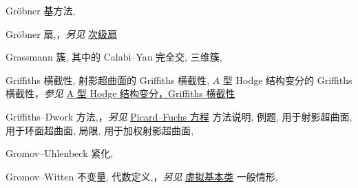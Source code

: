 \begin{theindex}
\indexspace
\item \leavevmode\hypertarget{idx:0452}{Gr\"obner 基方法},\enspace{}
\indexspace
\item \leavevmode\hypertarget{idx:0453}{Gr\"obner 扇},\enspace{}，\textit{另见} \hyperlink{idx:1239}{次级扇}
\indexspace
\item \leavevmode\hypertarget{idx:0454}{Grassmann 簇},\enspace{}
\subitem \leavevmode\hypertarget{idx:0455}{其中的 Calabi--Yau 完全交},\enspace{}
\subsubitem \leavevmode\hypertarget{idx:0456}{三维簇},\enspace{}
\indexspace
\item \leavevmode\hypertarget{idx:0483}{Griffiths 横截性},\enspace{}
\subitem \leavevmode\hypertarget{idx:0484}{射影超曲面的 Griffiths 横截性},\enspace{}
\subitem \leavevmode\hypertarget{idx:0485}{$A$ 型 Hodge 结构变分的 Griffiths 横截性}，\textit{参见} \hyperlink{idx:0021}{A 型 Hodge 结构变分，Griffiths 横截性}
\indexspace
\item \leavevmode\hypertarget{idx:0486}{Griffiths--Dwork 方法},\enspace{}，\textit{另见} \hyperlink{idx:1049}{Picard--Fuchs 方程}
\subitem \leavevmode\hypertarget{idx:0487}{方法说明},\enspace{}
\subitem \leavevmode\hypertarget{idx:0488}{例题},\enspace{}
\subitem \leavevmode\hypertarget{idx:0489}{用于射影超曲面},\enspace{}
\subitem \leavevmode\hypertarget{idx:0490}{用于环面超曲面},\enspace{}
\subitem \leavevmode\hypertarget{idx:0491}{局限},\enspace{}
\subitem \leavevmode\hypertarget{idx:0492}{用于加权射影超曲面},\enspace{}
\indexspace
\item \leavevmode\hypertarget{idx:0493}{Gromov--Uhlenbeck 紧化},\enspace{}
\indexspace
\item \leavevmode\hypertarget{idx:0515}{Gromov--Witten 不变量},\enspace{}
\subitem \leavevmode\hypertarget{idx:0516}{代数定义},\enspace{}，\textit{另见} \hyperlink{idx:1406}{虚拟基本类}
\subsubitem \leavevmode\hypertarget{source:482}{}\hypertarget{idx:0517}{一般情形},\enspace{}

\end{theindex}
